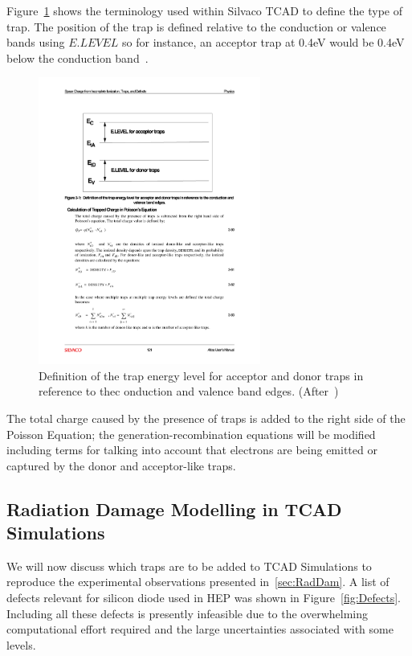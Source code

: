 Figure~\ref{fig:TCAD_Defects} shows the terminology used within Silvaco TCAD to define the type of trap. The position of the trap is defined relative to the conduction or valence bands using $E.LEVEL$ so for instance, an acceptor trap at 0.4eV would be 0.4eV below the conduction band~\cite{SilvacoAtlas}.

\begin{figure}
\centering
\includegraphics[width=0.65\textwidth]{TCAD_traps.pdf}
\caption{\label{fig:TCAD_Defects}Definition of the trap energy level for acceptor and donor traps in reference to thec onduction and valence band edges. (After~\cite{SilvacoAtlas})}
\end{figure}

The total charge caused by the presence of traps is added to the right side of the Poisson Equation; 
the generation-recombination equations will be modified including terms for talking into account 
that electrons are being emitted or captured by the donor and acceptor-like traps.



\subsection{Radiation Damage Modelling in TCAD Simulations}
\label{sec:TCADRadDamModels}

We will now discuss which traps are to be added to TCAD Simulations to reproduce the 
experimental observations presented in~\ref{sec:RadDam}.
A list of defects relevant for silicon diode used in HEP was shown 
in Figure~\ref{fig:Defects}.  Including all these defects is presently infeasible  due to the overwhelming computational effort required and the large uncertainties associated with some levels. 

